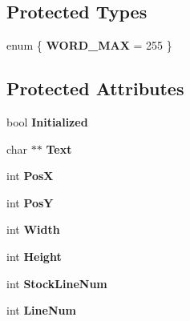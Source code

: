 \subsection*{Protected Types}
\begin{DoxyCompactItemize}
\item 
enum \{ {\bfseries W\+O\+R\+D\+\_\+\+M\+AX} = 255
 \}\hypertarget{class_c_log_window_ab5fed1a6f695003cf6bfae4f4c45b55d}{}\label{class_c_log_window_ab5fed1a6f695003cf6bfae4f4c45b55d}

\end{DoxyCompactItemize}
\subsection*{Protected Attributes}
\begin{DoxyCompactItemize}
\item 
bool {\bfseries Initialized}\hypertarget{class_c_log_window_a986a16a267c2d41363fe066314de4ee0}{}\label{class_c_log_window_a986a16a267c2d41363fe066314de4ee0}

\item 
char $\ast$$\ast$ {\bfseries Text}\hypertarget{class_c_log_window_a5c2399c56c2d02ee61ed9b733eaa6e27}{}\label{class_c_log_window_a5c2399c56c2d02ee61ed9b733eaa6e27}

\item 
int {\bfseries PosX}\hypertarget{class_c_log_window_a488d5b3a21d0f2d9e645c927fe0d9193}{}\label{class_c_log_window_a488d5b3a21d0f2d9e645c927fe0d9193}

\item 
int {\bfseries PosY}\hypertarget{class_c_log_window_ada10328613c4c8d2c9951927d9ba9607}{}\label{class_c_log_window_ada10328613c4c8d2c9951927d9ba9607}

\item 
int {\bfseries Width}\hypertarget{class_c_log_window_a94a87aabd208f92d49ab18597481f9f6}{}\label{class_c_log_window_a94a87aabd208f92d49ab18597481f9f6}

\item 
int {\bfseries Height}\hypertarget{class_c_log_window_afc77264b35d52aca76b03d1781721ddc}{}\label{class_c_log_window_afc77264b35d52aca76b03d1781721ddc}

\item 
int {\bfseries Stock\+Line\+Num}\hypertarget{class_c_log_window_a8d02ef592034112a45318e834bcfde28}{}\label{class_c_log_window_a8d02ef592034112a45318e834bcfde28}

\item 
int {\bfseries Line\+Num}\hypertarget{class_c_log_window_a79881c437c121f840d17b33cbf7f105c}{}\label{class_c_log_window_a79881c437c121f840d17b33cbf7f105c}


\end{DoxyCompactItemize}

